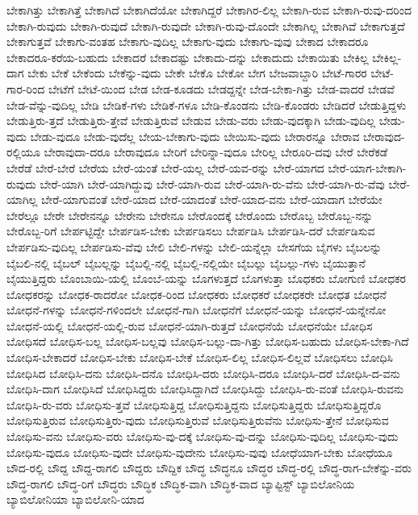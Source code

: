 {ಬೇಕಾಗಿತ್ತು
ಬೇಕಾಗಿತ್ತೆ
ಬೇಕಾಗಿದೆ
ಬೇಕಾಗಿದೆಯೋ
ಬೇಕಾಗಿದ್ದರೆ
ಬೇಕಾಗಿರ-ಲಿಲ್ಲ
ಬೇಕಾಗಿ-ರುವ
ಬೇಕಾಗಿ-ರುವು-ದರಿಂದ
ಬೇಕಾಗಿ-ರುವುದು
ಬೇಕಾಗಿ-ರುವುದೆ
ಬೇಕಾಗಿ-ರುವುದೇ
ಬೇಕಾಗಿ-ರುವು-ದೊಂದೇ
ಬೇಕಾಗಿಲ್ಲ
ಬೇಕಾಗಿವೆ
ಬೇಕಾಗುತ್ತದೆ
ಬೇಕಾಗುತ್ತವೆ
ಬೇಕಾಗು-ವಂತಹ
ಬೇಕಾಗು-ವುದಿಲ್ಲ
ಬೇಕಾಗು-ವುದು
ಬೇಕಾಗು-ವುವು
ಬೇಕಾದ
ಬೇಕಾದರೂ
ಬೇಕಾದರೂ-ಕರೆಯ-ಬಹುದು
ಬೇಕಾದರೆ
ಬೇಕಾದಷ್ಟು
ಬೇಕಾದು-ದನ್ನು
ಬೇಕಾದುದು
ಬೇಕಾಯಿತು
ಬೇಕಿಲ್ಲ
ಬೇಕಿಲ್ಲ-ದಾಗ
ಬೇಕು
ಬೇಕೆ
ಬೇಕೆಂದು
ಬೇಕೆನ್ನು-ವುದು
ಬೇಕೇ
ಬೇಕೊ
ಬೇಕೋ
ಬೇಗ
ಬೇಜವಾಬ್ದಾರಿ
ಬೇಟೆ-ಗಾರರ
ಬೇಟೆ-ಗಾರ-ರಿಂದ
ಬೇಟೆಗೆ
ಬೇಟೆ-ಯಿಂದ
ಬೇಡ
ಬೇಡ-ಕೂಡದು
ಬೇಡದ್ದನ್ನೇ
ಬೇಡ-ಬೇಕಾ-ಗಿತ್ತು
ಬೇಡ-ವಾದರೆ
ಬೇಡವೆ
ಬೇಡ-ವೆನ್ನು-ವುದಿಲ್ಲ
ಬೇಡಿ
ಬೇಡಿಕೆ-ಗಳು
ಬೇಡಿಕೆ-ಗಳೂ
ಬೇಡಿ-ಕೊಂಡನು
ಬೇಡಿ-ಕೊಂಡರು
ಬೇಡಿದರೆ
ಬೇಡುತ್ತಿದ್ದಳು
ಬೇಡುತ್ತಿರು-ತ್ತದೆ
ಬೇಡುತ್ತಿರು-ತ್ತೇವೆ
ಬೇಡುತ್ತಿರುವೆ
ಬೇಡುವ
ಬೇಡು-ವರು
ಬೇಡು-ವುದಕ್ಕಾಗಿ
ಬೇಡು-ವುದಿಲ್ಲ
ಬೇಡು-ವುದು
ಬೇಡು-ವುದೂ
ಬೇಡು-ವುದೆಲ್ಲ
ಬೇಯ-ಬೇಕಾಗು-ವುದು
ಬೇಯಿಸು-ವುದು
ಬೇರಾರನ್ನೂ
ಬೇರಾವ
ಬೇರಾವುದ-ರಲ್ಲಿಯೂ
ಬೇರಾವುದಾ-ದರೂ
ಬೇರಾವುದೂ
ಬೇರಿಗೆ
ಬೇರಿನ್ನಾ-ವುದೂ
ಬೇರಿಲ್ಲ
ಬೇರೂರಿ-ದವು
ಬೇರೆ
ಬೇರೆಕಡೆ
ಬೇರೆಡೆ
ಬೇರೆ-ಬೇರೆ
ಬೇರೆಯ
ಬೇರೆ-ಯಂತೆ
ಬೇರೆ-ಯಲ್ಲ
ಬೇರೆ-ಯವ-ರನ್ನು
ಬೇರೆ-ಯಾಗದ
ಬೇರೆ-ಯಾಗ-ಬೇಕಾಗಿ-ರುವುದು
ಬೇರೆ-ಯಾಗಿ
ಬೇರೆ-ಯಾಗಿದ್ದುವು
ಬೇರೆ-ಯಾಗಿ-ರುವ
ಬೇರೆ-ಯಾಗಿ-ರು-ವೆನು
ಬೇರೆ-ಯಾಗಿ-ರು-ವೆವು
ಬೇರೆ-ಯಾಗಿಲ್ಲ
ಬೇರೆ-ಯಾಗುವಂತೆ
ಬೇರೆ-ಯಾದ
ಬೇರೆ-ಯಾದಂತೆ
ಬೇರೆ-ಯಾದ-ವನು
ಬೇರೆ-ಯಾದಾಗ
ಬೇರೆಯೇ
ಬೇರೆಲ್ಲೂ
ಬೇರೇ
ಬೇರೇನನ್ನೂ
ಬೇರೇನು
ಬೇರೇನೂ
ಬೇರೊಂದಕ್ಕೆ
ಬೇರೊಂದು
ಬೇರೊಬ್ಬ
ಬೇರೊಬ್ಬ-ನನ್ನು
ಬೇರೊಬ್ಬ-ರಿಗೆ
ಬೇರ್ಪಟ್ಟಿದ್ದೇ
ಬೇರ್ಪಡಿಸ-ಬೇಕು
ಬೇರ್ಪಡಿಸಲು
ಬೇರ್ಪಡಿಸಿ
ಬೇರ್ಪಡಿಸಿ-ದರೆ
ಬೇರ್ಪಡಿಸುವ
ಬೇರ್ಪಡಿಸು-ವುದಿಲ್ಲ
ಬೇರ್ಪಡಿಸು-ವೆವು
ಬೇಲಿ
ಬೇಲಿ-ಗಳನ್ನು
ಬೇಲಿ-ಯನ್ನೆಲ್ಲಾ
ಬೇಸಗೆಯ
ಬೈಗಳು
ಬೈಬಲನ್ನು
ಬೈಬಲಿ-ನಲ್ಲಿ
ಬೈಬಲ್
ಬೈಬಲ್ಲನ್ನು
ಬೈಬಲ್ಲಿ-ನಲ್ಲಿ
ಬೈಬಲ್ಲಿ-ನಲ್ಲಿಯೇ
ಬೈಬಲ್ಲು
ಬೈಬಲ್ಲು-ಗಳು
ಬೈಯುತ್ತಾನೆ
ಬೈಯುತ್ತಿದ್ದರು
ಬೊಂಬಾಯಿ-ಯಲ್ಲಿ
ಬೊಂಬೆ-ಯನ್ನು
ಬೊಗಳುತ್ತದೆ
ಬೊಗಳುತ್ತಾ
ಬೊಧಕರು
ಬೋಗುಣಿ
ಬೋಧಕರ
ಬೋಧಕರನ್ನು
ಬೋಧಕ-ರಾದರೋ
ಬೋಧಕ-ರಿಂದ
ಬೋಧಕರು
ಬೋಧಕರೆ
ಬೋಧಕರೇ
ಬೋಧತ
ಬೋಧನೆ
ಬೋಧನೆ-ಗಳನ್ನು
ಬೋಧನೆ-ಗಳಿಂದಲೇ
ಬೋಧನೆ-ಗಾಗಿ
ಬೋಧನೆಗೆ
ಬೋಧನೆ-ಯನ್ನು
ಬೋಧನೆ-ಯನ್ನೇನೋ
ಬೋಧನೆ-ಯಲ್ಲಿ
ಬೋಧನೆ-ಯಲ್ಲಿ-ರುವ
ಬೋಧನೆ-ಯಾಗಿ-ರುತ್ತದೆ
ಬೋಧನೆಯೆ
ಬೋಧನೆಯೇ
ಬೋಧಿಸ
ಬೋಧಿಸದೆ
ಬೋಧಿಸ-ಬಲ್ಲ
ಬೋಧಿಸ-ಬಲ್ಲವು
ಬೋಧಿಸ-ಬಲ್ಲು-ದಾ-ಗಿತ್ತು
ಬೋಧಿಸ-ಬಹುದು
ಬೋಧಿಸ-ಬೇಕಾ-ಗಿದೆ
ಬೋಧಿಸ-ಬೇಕಾದರೆ
ಬೋಧಿಸ-ಬೇಕು
ಬೋಧಿಸ-ಬೇಕೆ
ಬೋಧಿಸ-ಲಿಲ್ಲ
ಬೋಧಿಸ-ಲಿಲ್ಲವೆ
ಬೋಧಿಸಲು
ಬೋಧಿಸಿ
ಬೋಧಿಸಿದ
ಬೋಧಿಸಿ-ದನು
ಬೋಧಿಸಿ-ದನೊ
ಬೋಧಿಸಿ-ದರು
ಬೋಧಿಸಿ-ದರೂ
ಬೋಧಿಸಿ-ದರೆ
ಬೋಧಿಸಿ-ದ-ವನು
ಬೋಧಿಸಿ-ದಾಗ
ಬೋಧಿಸಿದೆ
ಬೋಧಿಸಿದ್ದರು
ಬೋಧಿಸಿದ್ದಾಗಿದೆ
ಬೋಧಿಸಿದ್ದು
ಬೋಧಿಸಿ-ರು-ವಂತೆ
ಬೋಧಿಸಿ-ರುವನು
ಬೋಧಿಸಿ-ರು-ವರು
ಬೋಧಿಸು-ತ್ತವೆ
ಬೋಧಿಸುತ್ತಿದ್ದ
ಬೋಧಿಸುತ್ತಿದ್ದನು
ಬೋಧಿಸುತ್ತಿದ್ದರು
ಬೋಧಿಸುತ್ತಿದ್ದರೊ
ಬೋಧಿಸುತ್ತಿರುವ
ಬೋಧಿಸುತ್ತಿರು-ವುದು
ಬೋಧಿಸುತ್ತಿರುವೆ
ಬೋಧಿಸುತ್ತಿರುವೆನು
ಬೋಧಿಸು-ತ್ತೇನೆ
ಬೋಧಿಸುವ
ಬೋಧಿಸು-ವನು
ಬೋಧಿಸು-ವರು
ಬೋಧಿಸು-ವು-ದಕ್ಕೆ
ಬೋಧಿಸು-ವು-ದನ್ನು
ಬೋಧಿಸು-ವುದಿಲ್ಲ
ಬೋಧಿಸು-ವುದು
ಬೋಧಿಸು-ವುದೂ
ಬೋಧಿಸು-ವುದೇ
ಬೋಧಿಸು-ವುದೇನು
ಬೋಧಿಸು-ವುವು
ಬೋಧೆಯಾಗ-ಬೇಕು
ಬೋಧೆಯೂ
ಬೌದ-ರಲ್ಲಿ
ಬೌದ್ದ
ಬೌದ್ದ-ರಾಗಲಿ
ಬೌದ್ದರು
ಬೌದ್ದಿಕ
ಬೌದ್ಧ
ಬೌದ್ಧನೂ
ಬೌದ್ಧರ
ಬೌದ್ಧ-ರಲ್ಲಿ
ಬೌದ್ಧ-ರಾಗ-ಬೇಕೆನ್ನು-ವರು
ಬೌದ್ಧ-ರಾಗಲಿ
ಬೌದ್ಧ-ರಿಗೆ
ಬೌದ್ಧರು
ಬೌದ್ಧಿಕ
ಬೌದ್ಧಿಕ-ವಾಗಿ
ಬೌದ್ಧಿಕ-ವಾದ
ಬ್ಯಾಪ್ಟಿಸ್ಟ್
ಬ್ಯಾಬಿಲೋನಿಯ
ಬ್ಯಾಬಿಲೋನಿಯಾ
ಬ್ಯಾಬಿಲೋನಿ-ಯಾದ
}
